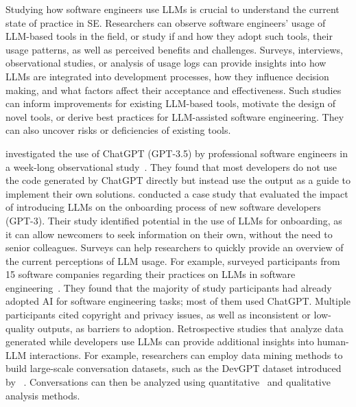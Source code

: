 \label{sec:studying-llm-usage-in-software-engineering}


Studying how software engineers use LLMs is crucial to understand the current state of practice in SE.
Researchers can observe software engineers' usage of LLM-based tools in the field, or study if and how they adopt such tools, their usage patterns, as well as perceived benefits and challenges.
Surveys, interviews, observational studies, or analysis of usage logs can provide insights into how LLMs are integrated into development processes, how they influence decision making, and what factors affect their acceptance and effectiveness. 
Such studies can inform improvements for existing LLM-based tools, motivate the design of novel tools, or derive best practices for LLM-assisted software engineering.
They can also uncover risks or deficiencies of existing tools.


\citeauthor{DBLP:journals/pacmse/KhojahM0N24} investigated the use of ChatGPT (GPT-3.5) by professional software engineers in a week-long observational study~\cite{DBLP:journals/pacmse/KhojahM0N24}.
They found that most developers do not use the code generated by ChatGPT directly but instead use the output as a guide to implement their own solutions.
\citeauthor{DBLP:conf/csee/AzanzaPIG24} conducted a case study that evaluated the impact of introducing LLMs on the onboarding process of new software developers~\cite{DBLP:conf/csee/AzanzaPIG24} (GPT-3).
Their study identified potential in the use of LLMs for onboarding, as it can allow newcomers to seek information on their own, without the need to  senior colleagues.
Surveys can help researchers to quickly provide an overview of the current perceptions of LLM usage.
For example, \citeauthor{DBLP:conf/icsa/JahicS24} surveyed participants from 15 software companies regarding their practices on LLMs in software engineering~\cite{DBLP:conf/icsa/JahicS24}.
They found that the majority of study participants had already adopted AI for software engineering tasks; most of them used ChatGPT.
Multiple participants cited copyright and privacy issues, as well as inconsistent or low-quality outputs, as barriers to adoption.
Retrospective studies that analyze data generated while developers use LLMs can provide additional insights into human-LLM interactions.
For example, researchers can employ data mining methods to build large-scale conversation datasets, such as the DevGPT dataset introduced by \citeauthor{DBLP:conf/msr/XiaoTHM24}~\cite{DBLP:conf/msr/XiaoTHM24}.
Conversations can then be analyzed using quantitative~\cite{DBLP:conf/msr/RabbiCZI24} and qualitative~\cite{DBLP:conf/msr/MohamedPP24} analysis methods.

